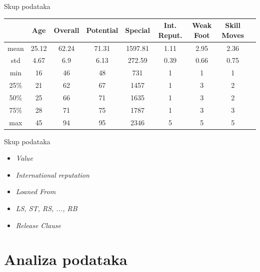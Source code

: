 \documentclass[12pt]{beamer}
\begin{document}
\begin{frame}{Skup podataka}
\begin{table}
\scriptsize
\begin{tabular}{c | c | c | c | c | c | c | c | c}
 & Age & Overall & Potential & Special 
& Int. Reput. & Weak Foot & Skill 
Moves \\
\hline
\hline
mean & 25.12 & 62.24 & 71.31 & 1597.81 & 1.11 &
2.95 & 2.36 \\
std & 4.67 & 6.9 & 6.13 & 272.59 & 0.39 &
0.66 & 0.75 \\
min & 16 & 46 & 48 & 731 & 1 & 1 & 1 \\
25\% & 21 & 62 & 67 & 1457 & 1 & 3 & 2 \\
50\% & 25 & 66 & 71 & 1635 & 1 & 3 & 2 \\
75\% & 28 & 71 & 75 & 1787 & 1 & 3 & 3 \\
max & 45 & 94 & 95 & 2346 & 5 & 5 & 5 \\
\end{tabular}
\end{table}
\end{frame}


\begin{frame}{Skup podataka}
\begin{itemize}
\item<1-> \emph{Value}
\item<2-> \emph{International reputation}
\item<3-> \emph{Loaned From}
\item<4-> \emph{LS, ST, RS, ..., RB}
\item<5-> \emph{Release Clause}
\end{itemize}
\end{frame}



\section{Analiza podataka}
\end{document}

